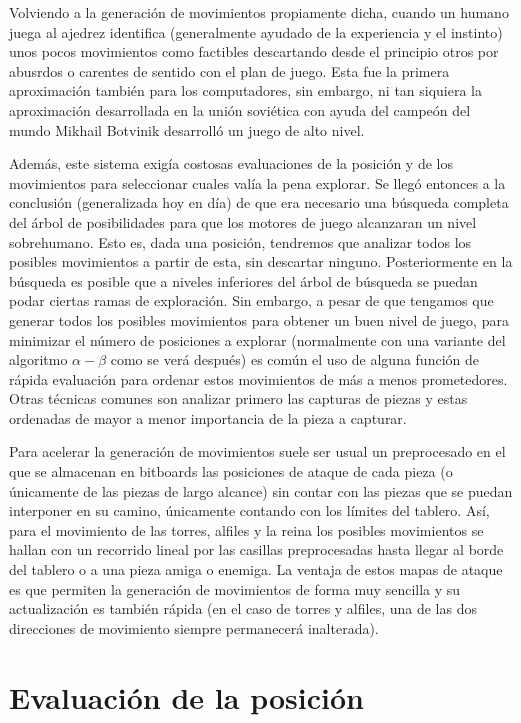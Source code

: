 \documentclass[letterpaper,12pt]{article}
\begin{document}
Volviendo a la generación de movimientos propiamente dicha, cuando un humano juega al 
ajedrez identifica (generalmente ayudado de la experiencia y el instinto) unos pocos 
movimientos como factibles descartando desde el principio otros por abusrdos o carentes 
de sentido con el plan de juego. Esta fue la primera aproximación también para los
computadores, sin embargo, ni tan siquiera la aproximación desarrollada en la unión 
soviética con ayuda del campeón del mundo Mikhail Botvinik desarrolló un juego de alto
nivel. 

Además, este sistema exigía costosas evaluaciones de la posición y de los movimientos 
para seleccionar cuales valía la pena explorar. Se llegó entonces a la conclusión 
(generalizada hoy en día) de que era necesario una búsqueda completa del árbol de 
posibilidades para que los motores de juego alcanzaran un nivel sobrehumano. Esto es,
dada una posición, tendremos que analizar todos los posibles movimientos a partir de
esta, sin descartar ninguno. Posteriormente en la búsqueda es posible que a niveles
inferiores del árbol de búsqueda se puedan podar ciertas ramas de exploración. 
Sin embargo, a pesar de que tengamos que generar todos los posibles movimientos para
obtener un buen nivel de juego, para minimizar el número de posiciones a explorar 
(normalmente con una variante del algoritmo $\alpha - \beta$ como se verá después) es
común el uso de alguna función de rápida evaluación para ordenar estos movimientos
de más a menos prometedores. Otras técnicas comunes son analizar primero las capturas
de piezas y estas ordenadas de mayor a menor importancia de la pieza a capturar.

Para acelerar la generación de movimientos suele ser usual un preprocesado en el que 
se almacenan en bitboards las posiciones de ataque de cada pieza (o únicamente de las
piezas de largo alcance) sin contar con las piezas que se puedan interponer en su camino,
únicamente contando con los límites del tablero. Así, para el movimiento de las torres,
alfiles y la reina los posibles movimientos se hallan con un recorrido lineal por las
casillas preprocesadas hasta llegar al borde del tablero o a una pieza amiga o enemiga. 
La ventaja de estos mapas de ataque es que permiten la generación de movimientos de 
forma muy sencilla y su actualización es también rápida (en el caso de torres y alfiles,
una de las dos direcciones de movimiento siempre permanecerá inalterada).


\section{Evaluación de la posición}
\end{document}
